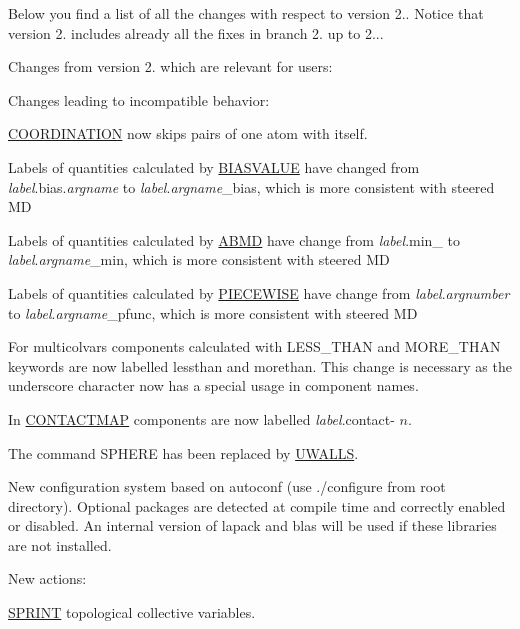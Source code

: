 Below you find a list of all the changes with respect to version 2.. Notice that version 2. includes already all the fixes in branch 2. up to 2...

Changes from version 2. which are relevant for users\+:
\begin{DoxyItemize}
\item Changes leading to incompatible behavior\+:
\begin{DoxyItemize}
\item \hyperlink{COORDINATION}{C\+O\+O\+R\+D\+I\+N\+A\+T\+I\+O\+N} now skips pairs of one atom with itself.
\item Labels of quantities calculated by \hyperlink{BIASVALUE}{B\+I\+A\+S\+V\+A\+L\+U\+E} have changed from {\itshape label}.bias.{\itshape argname} to {\itshape label}.{\itshape argname}\+\_\+bias, which is more consistent with steered M\+D
\item Labels of quantities calculated by \hyperlink{ABMD}{A\+B\+M\+D} have change from {\itshape label}.min\+\_ to {\itshape label}.{\itshape argname}\+\_\+min, which is more consistent with steered M\+D
\item Labels of quantities calculated by \hyperlink{PIECEWISE}{P\+I\+E\+C\+E\+W\+I\+S\+E} have change from {\itshape label}.{\itshape argnumber} to {\itshape label}.{\itshape argname}\+\_\+pfunc, which is more consistent with steered M\+D
\item For multicolvars components calculated with L\+E\+S\+S\+\_\+\+T\+H\+A\+N and M\+O\+R\+E\+\_\+\+T\+H\+A\+N keywords are now labelled lessthan and morethan. This change is necessary as the underscore character now has a special usage in component names.
\item In \hyperlink{CONTACTMAP}{C\+O\+N\+T\+A\+C\+T\+M\+A\+P} components are now labelled {\itshape label}.contact-\/ $n$.
\item The command S\+P\+H\+E\+R\+E has been replaced by \hyperlink{UWALLS}{U\+W\+A\+L\+L\+S}.
\end{DoxyItemize}
\item New configuration system based on autoconf (use ./configure from root directory). Optional packages are detected at compile time and correctly enabled or disabled. An internal version of lapack and blas will be used if these libraries are not installed.
\item New actions\+:
\begin{DoxyItemize}
\item \hyperlink{SPRINT}{S\+P\+R\+I\+N\+T} topological collective variables.

\end{DoxyItemize}
\end{DoxyItemize}
